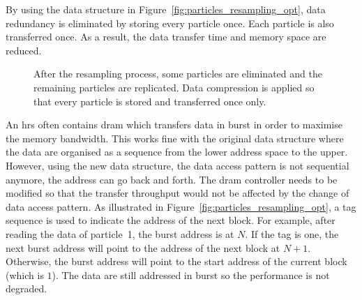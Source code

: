 By using the data structure in Figure~\ref{fig:particles_resampling_opt}, data redundancy is eliminated by storing every particle once.
Each particle is also transferred once.
As a result, the data transfer time and memory space are reduced.

\setcounter{subfigure}{0}
\begin{figure}[t!]
\centering
{}
\caption{After the resampling process, some particles are eliminated and the remaining particles are replicated. Data compression is applied so that every particle is stored and transferred once only.}
\label{fig:particles_resampling}
\end{figure}

An \gls{hrs} often contains \gls{dram} which transfers data in burst in order to maximise the memory bandwidth.
This works fine with the original data structure where the data are organised as a sequence from the lower address space to the upper.
However, using the new data structure, the data access pattern is not sequential anymore, the address can go back and forth.
The \gls{dram} controller needs to be modified so that the transfer throughput would not be affected by the change of data access pattern.
As illustrated in Figure~\ref{fig:particles_resampling_opt}, a tag sequence is used to indicate the address of the next block.
For example, after reading the data of particle~1, the burst address is at $N$.
If the tag is one, the next burst address will point to the address of the next block at $N+1$.
Otherwise, the burst address will point to the start address of the current block (which is $1$).
The data are still addressed in burst so the performance is not degraded.

